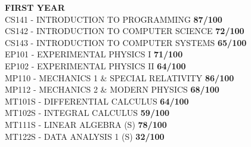 \textbf{FIRST YEAR\\}
CS141 - INTRODUCTION TO PROGRAMMING \textbf{87/100}\\
CS142 - INTRODUCTION TO COMPUTER SCIENCE \textbf{72/100}\\
CS143 - INTRODUCTION TO COMPUTER SYSTEMS \textbf{65/100}\\
EP101 - EXPERIMENTAL PHYSICS I \textbf{71/100}\\
EP102 - EXPERIMENTAL PHYSICS II \textbf{64/100}\\
MP110 - MECHANICS 1 \& SPECIAL RELATIVITY \textbf{86/100}\\
MP112 - MECHANICS 2 \& MODERN PHYSICS \textbf{68/100}\\
MT101S - DIFFERENTIAL CALCULUS \textbf{64/100}\\
MT102S - INTEGRAL CALCULUS \textbf{59/100}\\
MT111S - LINEAR ALGEBRA (S) \textbf{78/100}\\
MT122S - DATA ANALYSIS 1 (S) \textbf{32/100}\\